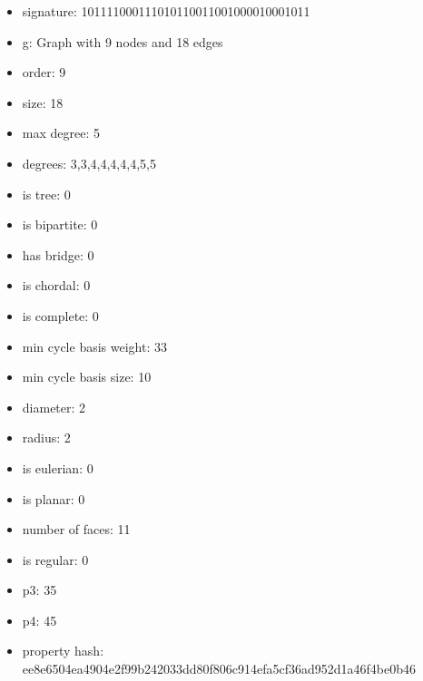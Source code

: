 \newpage
\begin{figure}
\end{figure}
\begin{itemize}
\item signature: 101111000111010110011001000010001011
\item g: Graph with 9 nodes and 18 edges
\item order: 9
\item size: 18
\item max degree: 5
\item degrees: 3,3,4,4,4,4,4,5,5
\item is tree: 0
\item is bipartite: 0
\item has bridge: 0
\item is chordal: 0
\item is complete: 0
\item min cycle basis weight: 33
\item min cycle basis size: 10
\item diameter: 2
\item radius: 2
\item is eulerian: 0
\item is planar: 0
\item number of faces: 11
\item is regular: 0
\item p3: 35
\item p4: 45
\item property hash: ee8e6504ea4904e2f99b242033dd80f806c914efa5cf36ad952d1a46f4be0b46
\end{itemize}
